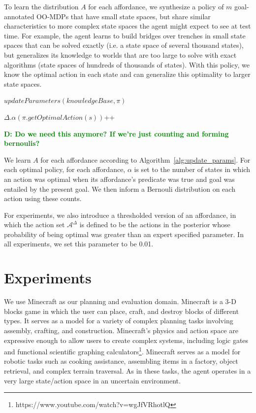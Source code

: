 \documentclass[conference]{IEEEtran}
\newcommand{\dnote}[1]{\textcolor{Green}{\textbf{D: #1}}}
\begin{document}
To learn the distribution $A$ for each affordance, we synthesize a policy of
$m$ goal-annotated OO-MDPs that have small state spaces, but share similar 
characteristics to more complex state spaces the agent might expect to see at test time.
For example, the agent learns to build bridges over trenches in small state
spaces that can be solved exactly (i.e. a state space of several thousand states), but
generalizes its knowledge to worlds that are too large to solve with exact algorithms
(state spaces of hundreds of thousands of states). With this policy, we know the optimal 
action in each state and can generalize this optimality to larger state spaces. 

\begin{algorithm}
  \caption{$updateParameters(knowledgeBase, \pi)$}
  \begin{algorithmic}[1]
    \State $\Delta.\alpha(\pi.getOptimalAction(s))$++
    \EndIf
    \EndFor
    \EndFor
  \end{algorithmic}
  \label{alg:update_params}
  \caption{\dnote{Do we need this anymore? If we're just counting and forming bernoulis?}}
\end{algorithm}

We learn $A$ for each affordance according to Algorithm~\ref{alg:update_params}.
For each optimal policy, for each affordance, $\alpha$ is set to the number of states
in which an action was optimal when its affordance's predicate was true and goal was
entailed by the present goal. We then inform a Bernouli distribution on each action 
using these counts.

For experiments, we also introduce a thresholded version of an affordance, in which
the action set $\mathcal{A}^\Delta$ is defined to be the actions in the posterior
whose probability of being optimal was greater than an expert specified parameter. In
all experiments, we set this parameter to be 0.01.

\section{Experiments}
\label{sec:experiments}

We use Minecraft as our planning and evaluation domain. Minecraft is a
3-D blocks game in which the user can place, craft, and destroy blocks
of different types. It serves as a model for a variety of complex planning tasks involving 
assembly, crafting, and construction.  Minecraft's physics and action space are expressive
enough to allow users to create complex systems, including logic gates and 
functional scientific graphing calculators\footnote{https://www.youtube.com/watch?v=wgJfVRhotlQ}.
Minecraft serves as a model for robotic tasks such as cooking assistance, assembling
items in a factory, object retrieval, and complex terrain traversal.  As in these tasks, 
the agent operates in a very large state/action space in an uncertain environment.
\end{document}
